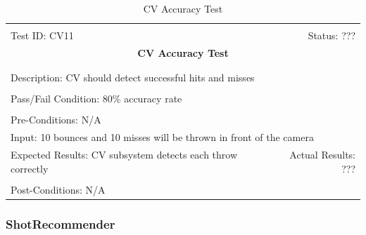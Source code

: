 \documentclass[11pt]{article}
\begin{document}
\begin{center}
\begin{table}[H]
\begin{tabular}{|l r|}\hline&\\[-2mm]
	Test ID: CV11	&Status: ???\\[-3mm]
	\multicolumn{2}{|c|}{\textbf{\large{CV Accuracy Test}}}\\&\\\hline&\\[-3mm]
	\multicolumn{2}{|p{\textwidth}|}{Description: CV should detect successful hits and misses}\\[1mm]\hline&\\[-3mm]
	\multicolumn{2}{|p{\textwidth}|}{Pass/Fail Condition: 80\% accuracy rate}\\[1mm]\hline&\\[-3mm]
	\multicolumn{2}{|p{\textwidth}|}{Pre-Conditions: N/A}\\[4mm]
	\multicolumn{2}{|p{\textwidth}|}{Input: 10 bounces and 10 misses will be thrown in front of the camera}\\[2mm]\hline
	\multicolumn{1}{|p{0.49\textwidth}}{Expected Results: CV subsystem detects each throw correctly}	&\multicolumn{1}{|p{0.45\textwidth}|}{Actual Results: ???}\\\hline&\\[-3mm]
	\multicolumn{2}{|p{\textwidth}|}{Post-Conditions: N/A}\\\hline
\end{tabular}
\caption{CV Accuracy Test}
\end{table}
\end{center}

\subsubsection{ShotRecommender}
\end{document}
